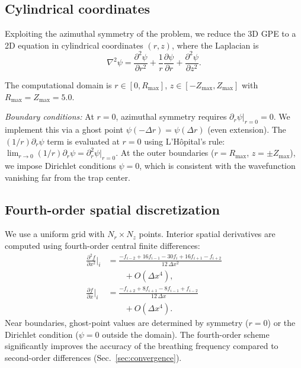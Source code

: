 \documentclass[twocolumn,superscriptaddress,aps,pra,longbibliography]{revtex4-2}
\begin{document}
\subsection{Cylindrical coordinates}

Exploiting the azimuthal symmetry of the problem, we reduce the 3D GPE
to a 2D equation in cylindrical coordinates $(r,z)$, where the Laplacian
is
\begin{equation}
\nabla^2\psi = \frac{\partial^2\psi}{\partial r^2}
+ \frac{1}{r}\frac{\partial\psi}{\partial r}
+ \frac{\partial^2\psi}{\partial z^2}.
\label{eq:lap_cyl}
\end{equation}

The computational domain is $r \in [0, R_{\max}]$,
$z \in [-Z_{\max}, Z_{\max}]$ with $R_{\max} = Z_{\max} = 5.0$.

\emph{Boundary conditions:}
At $r=0$, azimuthal symmetry requires $\partial_r\psi|_{r=0} = 0$.
We implement this via a ghost point $\psi(-\Delta r) = \psi(\Delta r)$
(even extension).  The $(1/r)\partial_r\psi$ term is evaluated at $r=0$
using L'H\^opital's rule:
$\lim_{r\to 0}(1/r)\partial_r\psi = \partial_r^2\psi|_{r=0}$.
At the outer boundaries ($r = R_{\max}$, $z = \pm Z_{\max}$), we impose
Dirichlet conditions $\psi = 0$, which is consistent with the wavefunction
vanishing far from the trap center.

\subsection{Fourth-order spatial discretization}

We use a uniform grid with $N_r \times N_z$ points.  Interior spatial
derivatives are computed using fourth-order central finite differences:
\begin{align}
\frac{\partial^2 f}{\partial x^2}\bigg|_i
&= \frac{-f_{i-2} + 16f_{i-1} - 30f_i + 16f_{i+1} - f_{i+2}}{12\,\Delta x^2}
\nonumber\\
&\qquad + O(\Delta x^4),
\label{eq:fd4_d2}
\\[4pt]
\frac{\partial f}{\partial x}\bigg|_i
&= \frac{-f_{i+2} + 8f_{i+1} - 8f_{i-1} + f_{i-2}}{12\,\Delta x}
\nonumber\\
&\qquad + O(\Delta x^4).
\label{eq:fd4_d1}
\end{align}
Near boundaries, ghost-point values are determined by symmetry ($r=0$) or
the Dirichlet condition ($\psi=0$ outside the domain).  The fourth-order
scheme significantly improves the accuracy of the breathing frequency
compared to second-order differences (Sec.~\ref{sec:convergence}).
\end{document}
